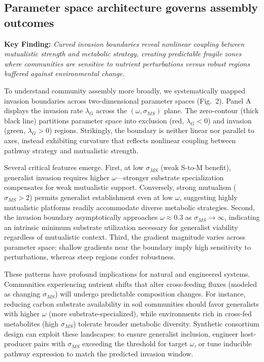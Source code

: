 \documentclass[9pt,twocolumn]{pnas-new}
\begin{document}
\subsection*{Parameter space architecture governs assembly outcomes}

\textbf{Key Finding:} \textit{Curved invasion boundaries reveal nonlinear coupling between mutualistic strength and metabolic strategy, creating predictable fragile zones where communities are sensitive to nutrient perturbations versus robust regions buffered against environmental change.}

To understand community assembly more broadly, we systematically mapped invasion boundaries across two-dimensional parameter spaces (Fig.~2). Panel A displays the invasion rate $\lambda_G$ across the $(\omega, \sigma_{MS})$ plane. The zero-contour (thick black line) partitions parameter space into exclusion (red, $\lambda_G < 0$) and invasion (green, $\lambda_G > 0$) regions. Strikingly, the boundary is neither linear nor parallel to axes, instead exhibiting curvature that reflects nonlinear coupling between pathway strategy and mutualistic strength.

Several critical features emerge. First, at low $\sigma_{MS}$ (weak S-to-M benefit), generalist invasion requires higher $\omega$—stronger substrate specialization compensates for weak mutualistic support. Conversely, strong mutualism ($\sigma_{MS} > 2$) permits generalist establishment even at low $\omega$, suggesting highly mutualistic platforms readily accommodate diverse metabolic strategies. Second, the invasion boundary asymptotically approaches $\omega \approx 0.3$ as $\sigma_{MS} \to \infty$, indicating an intrinsic minimum substrate utilization necessary for generalist viability regardless of mutualistic context. Third, the gradient magnitude varies across parameter space: shallow gradients near the boundary imply high sensitivity to perturbations, whereas steep regions confer robustness.

These patterns have profound implications for natural and engineered systems. Communities experiencing nutrient shifts that alter cross-feeding fluxes (modeled as changing $\sigma_{MS}$) will undergo predictable composition changes. For instance, reducing carbon substrate availability in soil communities should favor generalists with higher $\omega$ (more substrate-specialized), while environments rich in cross-fed metabolites (high $\sigma_{MS}$) tolerate broader metabolic diversity. Synthetic consortium design can exploit these landscapes: to ensure generalist inclusion, engineer host-producer pairs with $\sigma_{MS}$ exceeding the threshold for target $\omega$, or tune inducible pathway expression to match the predicted invasion window.
\end{document}
